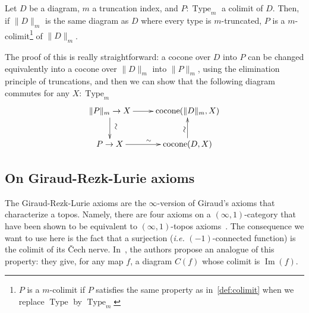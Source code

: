 \documentclass[notfinal]{jfrarticle}
\DeclareMathOperator{\Type}{Type}
\DeclareMathOperator{\im}{Im}
\newcommand \colim {\mathrm{colim}}
\newcommand{\ie}{\emph{i.e.}}
\begin{document}
\begin{lem}
  Let $D$ be a diagram, $m$ a truncation index, and
  $P:\Type_{m}$ a colimit of $D$. 
  Then, if $\|D\|_m$ is the same diagram as $D$ where every type
  is $m$-truncated, $P$ is a $m$-colimit\footnote{$P$ is a $m$-colimit
    if $P$ satisfies the same property as in~\ref{def:colimit} when
    we replace $\Type$ by $\Type_m$} of $\|D\|_m$.
\end{lem}
The proof of this is really straightforward: a cocone over $D$ into
$P$ can be changed equivalently into a cocone over $\|D\|_m$ into $\|P\|_m$, using the
elimination principle of truncations, and then
we can show that the following diagram commutes for any $X:\Type_m$
\[
  \xymatrix{
    \|P\|_m \to X \ar[r] \ar[d]^*[@]{\hbox to 0pt{\hss$\sim$\hss}} & \mathrm{cocone}(\|D\|_m,X) \\
    P \to X \ar[r]^\sim& \mathrm{cocone}(D,X) \ar[u]^*[@]{\hbox to 0pt{\hss$\sim$\hss}}
  }
\]



\subsection{On Giraud-Rezk-Lurie axioms}
\label{ssec:giraud-ax}


The Giraud-Rezk-Lurie axioms are the $\infty$-version of Giraud's
axioms that characterize a topos. Namely, there are four axioms on a
$(\infty,1)$-category that have been shown to be equivalent to
$(\infty,1)$-topos axioms~\cite[Chapter 6]{lurie}.
%
The consequence we want to use here is the fact that a surjection
(\ie{} $(-1)$-connected function) is the colimit of its \v{C}ech
nerve.
%
In~\cite{boulier}, the authors propose an analogue of this property:
they give, for any map $f$, a diagram $C(f)$ whose colimit is $\im(f)$.
\end{document}
